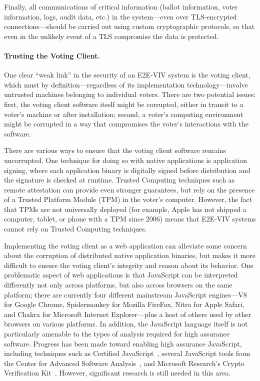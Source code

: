 Finally, all communications of critical information (ballot
information, voter information, logs, audit data, etc.) in the
system---even over TLS-encrypted connections---should be carried out
using custom cryptographic protocols, so that even in the unlikely
event of a TLS compromise the data is protected.

\paragraph{Trusting the Voting Client.} One clear ``weak link'' in the
security of an E2E-VIV system is the voting client, which must by
definition---regardless of its implementation technology---involve
untrusted machines belonging to individual voters. There are two
potential issues: first, the voting client software itself might be
corrupted, either in transit to a voter's machine or after
installation; second, a voter's computing environment might be
corrupted in a way that compromises the voter's interactions with the
software.

There are various ways to ensure that the voting client software
remains uncorrupted. One technique for doing so with native
applications is application signing, where each application binary is
digitally signed before distribution and the signature is checked at
runtime. Trusted Computing techniques such as remote attestation can
provide even stronger guarantees, but rely on the presence of a
Trusted Platform Module (TPM) in the voter's computer.  However, the
fact that TPMs are not universally deployed (for example, Apple has
not shipped a computer, tablet, or phone with a TPM since 2006) means
that E2E-VIV systems cannot rely on Trusted Computing techniques.

Implementing the voting client as a web application can alleviate some
concern about the corruption of distributed native application
binaries, but makes it more difficult to ensure the voting client's
integrity and reason about its behavior. One problematic aspect of web
applications is that JavaScript can be interpreted differently not
only across platforms, but also across browsers on the same platform;
there are currently four different mainstream JavaScript engines---V8
for Google Chrome, Spidermonkey for Mozilla FireFox, Nitro for Apple
Safari, and Chakra for Microsoft Internet Explorer---plus a host of
others used by other browsers on various platforms. In addition, the
JavaScript language itself is not particularly amenable to the types
of analysis required for high assurance software. Progress has been
made toward enabling high assurance JavaScript, including techniques
such as Certified JavaScript~\cite{JSCert}, several JavaScript tools
from the Center for Advanced Software Analysis~\cite{CASATools}, and
Microsoft Research's Crypto Verification Kit~\cite{CVK}. However,
significant research is still needed in this area.

